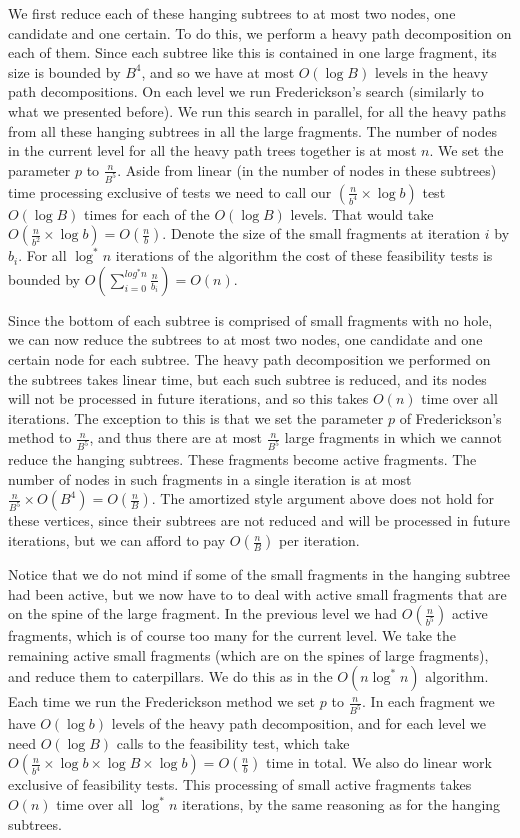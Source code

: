 \documentclass[11pt,a4paper]{article}
\theoremstyle{definition}
\theoremstyle{remark}
\begin{document}
We first reduce each of these hanging subtrees to at most two nodes, one candidate and one certain. To do this, we perform a heavy path decomposition on each of them. Since each subtree like this is contained in one large fragment, its size is bounded by $B^4$, and so we have at most $O(\log B)$ levels in the heavy path decompositions. On each level we run Frederickson's search (similarly to what we presented before). We run this search in parallel, for all the heavy paths from all these hanging subtrees in all the large fragments. The number of nodes in the current level for all the heavy path trees together is at most $n$. We set the parameter $p$ to $\frac{n}{B^5}$. Aside from linear (in the number of nodes in these subtrees) time processing exclusive of tests we need to call our $(\frac{n}{b^4} \times \log b)$ test $O(\log B)$ times for each of the $O(\log B)$ levels. That would take $O(\frac{n}{b^2} \times \log b) = O(\frac{n}{b})$. Denote the size of the small fragments at iteration $i$ by $b_i$. For all $\log ^*n$ iterations of the algorithm the cost of these feasibility tests is bounded by $O(\sum_{i=0}^{log^*n} \frac{n}{b_i}) = O(n)$.

Since the bottom of each subtree is comprised of small fragments with no hole, we can now reduce the subtrees to at most two nodes, one candidate and one certain node for each subtree. The heavy path decomposition we performed on the subtrees takes linear time, but each such subtree is reduced, and its nodes will not be processed in future iterations, and so this takes $O(n)$ time over all iterations. The exception to this is that we set the parameter $p$ of Frederickson's method to $\frac{n}{B^5}$, and thus there are at most $\frac{n}{B^5}$ large fragments in which we cannot reduce the hanging subtrees. These fragments become active fragments. The number of nodes in such fragments in a single iteration is at most $\frac{n}{B^5} \times O(B^4) = O(\frac{n}{B})$. The amortized style argument above does not hold for these vertices, since their subtrees are not reduced and will be processed in future iterations, but we can afford to pay $O(\frac{n}{B})$ per iteration.

Notice that we do not mind if some of the small fragments in the hanging subtree had been active, but we now have to to deal with active small fragments that are on the spine of the large fragment. In the previous level we had $O(\frac{n}{b^5})$ active fragments, which is of course too many for the current level. We take the remaining active small fragments (which are on the spines of large fragments), and reduce them to caterpillars. We do this as in the $O(n \log^* n)$ algorithm. Each time we run the Frederickson method we set $p$ to $\frac{n}{B^5}$. In each fragment we have $O(\log b)$ levels of the heavy path decomposition, and for each level we need $O(\log B)$ calls to the feasibility test, which take  $O(\frac{n}{b^4} \times \log b \times \log B \times \log b) = O(\frac{n}{b})$ time in total. We also do linear work exclusive of feasibility tests. This processing of small active fragments takes $O(n)$ time over all $\log ^*n$ iterations, by the same reasoning as for the hanging subtrees.
\end{document}
